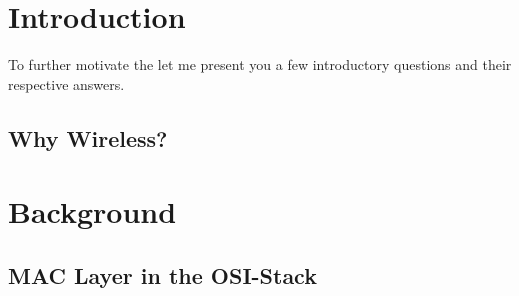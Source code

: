 \documentclass{article}
\begin{document}
\clearpage

\section{Introduction}

To further motivate the let me present you a few introductory questions and their respective answers.

\subsection{Why Wireless?}

\section{Background}

\subsection{MAC Layer in the OSI-Stack}
\end{document}
